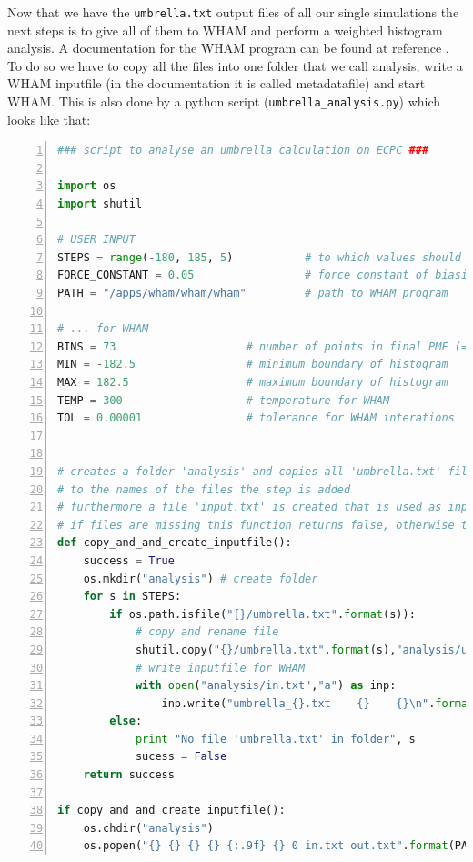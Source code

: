\documentclass[a4paper,11pt]{scrartcl}
\begin{document}
Now that we have the \texttt{umbrella.txt} output files of all our single simulations the next steps is to give all of them to WHAM and perform a weighted histogram analysis. A documentation for the WHAM program can be found at reference \cite{grossfield_wham_nodate}. To do so we have to copy all the files into one folder that we call analysis, write a WHAM inputfile (in the documentation it is called metadatafile) and start WHAM. This is also done by a python script (\texttt{umbrella\_analysis.py}) which looks like that:
\begin{lstlisting}[frame=single,language=python,basicstyle=\footnotesize,commentstyle=\color{red},keywordstyle=\color{blue},stringstyle=\color{mygreen},numbers=left,escapechar=|]
### script to analyse an umbrella calculation on ECPC ###

import os
import shutil

# USER INPUT
STEPS = range(-180, 185, 5)           # to which values should the restraint be set? 
FORCE_CONSTANT = 0.05                 # force constant of biasing potential
PATH = "/apps/wham/wham/wham"         # path to WHAM program

# ... for WHAM
BINS = 73                    # number of points in final PMF (= number of bins)
MIN = -182.5                 # minimum boundary of histogram
MAX = 182.5                  # maximum boundary of histogram
TEMP = 300                   # temperature for WHAM 
TOL = 0.00001                # tolerance for WHAM interations


# creates a folder 'analysis' and copies all 'umbrella.txt' files there
# to the names of the files the step is added
# furthermore a file 'input.txt' is created that is used as input for WHAM
# if files are missing this function returns false, otherwise true
def copy_and_and_create_inputfile():
    success = True
    os.mkdir("analysis") # create folder
    for s in STEPS:
        if os.path.isfile("{}/umbrella.txt".format(s)):
            # copy and rename file
            shutil.copy("{}/umbrella.txt".format(s),"analysis/umbrella_{}.txt".format(s))
            # write inputfile for WHAM
            with open("analysis/in.txt","a") as inp:         
                inp.write("umbrella_{}.txt    {}    {}\n".format(s,float(s),FORCE_CONSTANT))
        else:
            print "No file 'umbrella.txt' in folder", s
            sucess = False
    return success

if copy_and_and_create_inputfile():
    os.chdir("analysis")
    os.popen("{} {} {} {} {:.9f} {} 0 in.txt out.txt".format(PATH,MIN,MAX,BINS,TOL,TEMP)) |\label{runWHAM}
\end{lstlisting}
\end{document}
